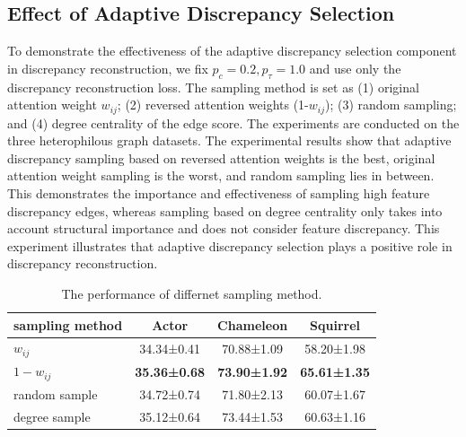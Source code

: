\documentclass[sigconf]{acmart}
\begin{document}
\subsection{Effect of Adaptive Discrepancy Selection}
To demonstrate the effectiveness of the adaptive discrepancy selection component in discrepancy reconstruction, we fix $p_c=0.2,p_\tau=1.0$ and use only the discrepancy reconstruction loss. The sampling method is set as (1) original attention weight $w_{ij}$; (2) reversed attention weights (1-$w_{ij}$); (3) random sampling; and (4) degree centrality of the edge score. The experiments are conducted on the three heterophilous graph datasets. The experimental results show that adaptive discrepancy sampling based on reversed attention weights is the best, original attention weight sampling is the worst, and random sampling lies in between. This demonstrates the importance and effectiveness of sampling high feature discrepancy edges, whereas sampling based on degree centrality only takes into account structural importance and does not consider feature discrepancy. This experiment illustrates that adaptive discrepancy selection plays a positive role in discrepancy reconstruction.
\begin{table}[h]
\caption{The performance of differnet sampling method.}
\centering
\begin{tabular}{l|ccc}
 \toprule
sampling method & Actor & Chameleon & Squirrel \\
\midrule
$w_{ij}$ & 34.34±0.41 & 70.88±1.09 & 58.20±1.98 \\
$1-w_{ij}$ & \textbf{35.36±0.68} & \textbf{73.90±1.92} & \textbf{65.61±1.35} \\
random sample & 34.72±0.74 & 71.80±2.13 & 60.07±1.67 \\
degree sample & 35.12±0.64 & 73.44±1.53 & 60.63±1.16 \\
\bottomrule
\end{tabular}
\label{tab:adaptive discrepancy}
\end{table}
\end{document}

